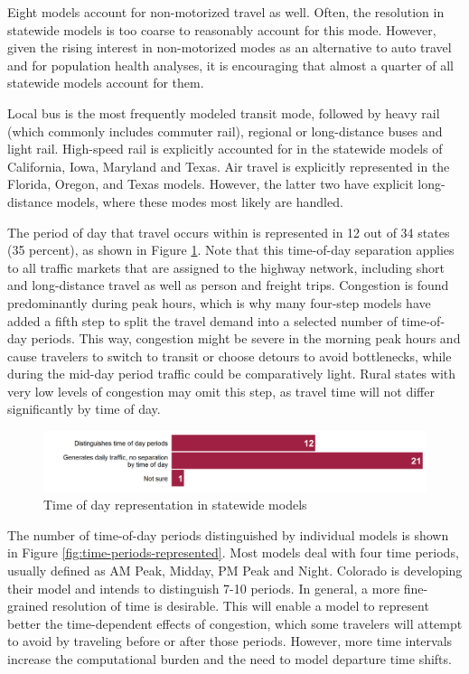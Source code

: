 Eight models account for non-motorized travel as well. Often, the resolution in statewide models is too coarse to reasonably account for this mode. However, given the rising interest in non-motorized modes as an alternative to auto travel and for population health analyses, it is encouraging that almost a quarter of all statewide models account for them.

Local bus is the most frequently modeled transit mode, followed by heavy rail (which commonly includes commuter rail), regional or long-distance buses and light rail. High-speed rail is explicitly accounted for in the statewide models of California, Iowa, Maryland and Texas. Air travel is explicitly represented in the Florida, Oregon, and Texas models. However, the latter two have explicit long-distance models, where these modes most likely are handled.

The period of day that travel occurs within is represented in 12 out of 34 states (35 percent), as shown in Figure \ref{fig:time-of-day}. Note that this time-of-day separation applies to all traffic markets that are assigned to the highway network, including short and long-distance travel as well as person and freight trips. Congestion is found predominantly during peak hours, which is why many four-step models have added a fifth step to split the travel demand into a selected number of time-of-day periods. This way, congestion might be severe in the morning peak hours and cause travelers to switch to transit or choose detours to avoid bottlenecks, while during the mid-day period traffic could be comparatively light. Rural states with very low levels of congestion may omit this step, as travel time will not differ significantly by time of day.

\begin{figure}   %
\centering
\includegraphics[width=6.4in]{graphics/11-time-of-day}
\caption{Time of day representation in statewide models}
\label{fig:time-of-day}
\end{figure}

The number of time-of-day periods distinguished by individual models is shown in Figure \ref{fig:time-periods-represented}. Most models deal with four time periods, usually defined as AM Peak, Midday, PM Peak and Night. Colorado is developing their model and intends to distinguish 7-10 periods. In general, a more fine-grained resolution of time is desirable. This will enable a model to represent better the time-dependent effects of congestion, which some travelers will attempt to avoid by traveling before or after those periods. However, more time intervals increase the computational burden and the need to model departure time shifts.

